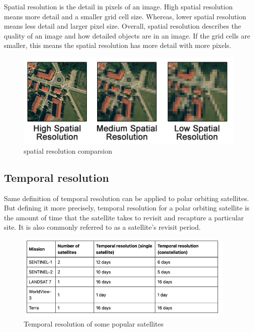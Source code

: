 \documentclass[
]{book}
\begin{document}
Spatial resolution is the detail in pixels of an image. High spatial resolution means more detail and a smaller grid cell size. Whereas, lower spatial resolution means less detail and larger pixel size. Overall, spatial resolution describes the quality of an image and how detailed objects are in an image. If the grid cells are smaller, this means the spatial resolution has more detail with more pixels.

\begin{figure}
\centering
\includegraphics{images/Spatial-Resolution-Comparison.png}
\caption{spatial resolution comparsion}
\end{figure}

\hypertarget{temporal-resolution}{%
\subsection{\texorpdfstring{\textbf{Temporal resolution}}{Temporal resolution}}\label{temporal-resolution}}

Same definition of temporal resolution can be applied to polar orbiting satellites. But defining it more precisely, temporal resolution for a polar orbiting satellite is the amount of time that the satellite takes to revisit and recapture a particular site. It is also commonly referred to as a satellite's revisit period.

\begin{figure}
\centering
\includegraphics[width=0.95\textwidth,height=\textheight]{images/temporal-resolution.png}
\caption{Temporal resolution of some popular satellites}
\end{figure}
\end{document}

